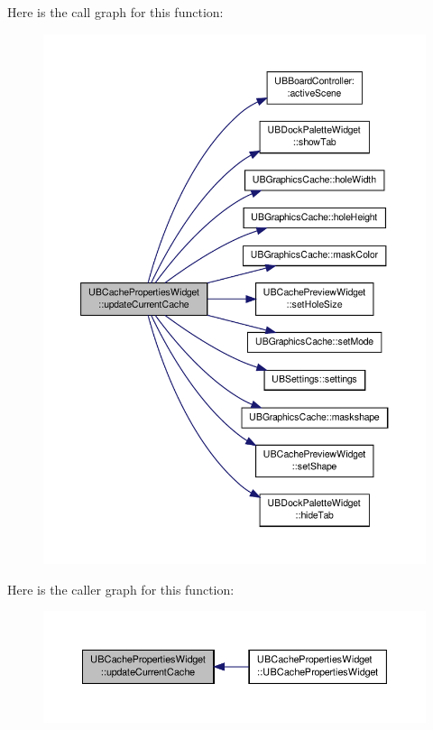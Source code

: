Here is the call graph for this function\-:
\nopagebreak
\begin{figure}[H]
\begin{center}
\leavevmode
\includegraphics[width=350pt]{d8/ddf/class_u_b_cache_properties_widget_a100e7726fb61b849fccbcee8dd198742_cgraph}
\end{center}
\end{figure}




Here is the caller graph for this function\-:
\nopagebreak
\begin{figure}[H]
\begin{center}
\leavevmode
\includegraphics[width=350pt]{d8/ddf/class_u_b_cache_properties_widget_a100e7726fb61b849fccbcee8dd198742_icgraph}
\end{center}
\end{figure}


